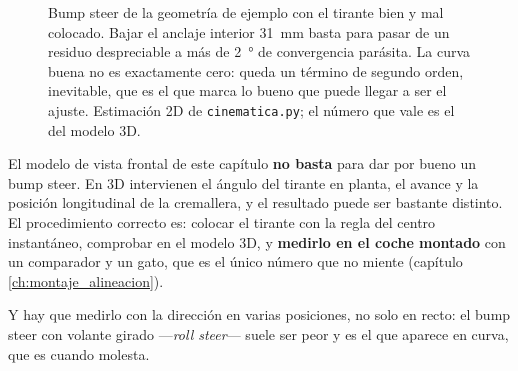 \begin{figure}[htbp]
\centering
{}
\caption[Efecto de la posición del tirante sobre el bump steer]{Bump steer de
la geometría de ejemplo con el tirante bien y mal colocado. Bajar el anclaje
interior \SI{31}{\milli\meter} basta para pasar de un residuo despreciable a
más de \SI{2}{\degree} de convergencia parásita. La curva buena no es
exactamente cero: queda un término de segundo orden, inevitable, que es el que
marca lo bueno que puede llegar a ser el ajuste. Estimación 2D de
\texttt{cinematica.py}; el número que vale es el del modelo 3D.}
\label{fig:cinematica:bumpsteer}
\end{figure}

\begin{ojo}
El modelo de vista frontal de este capítulo \textbf{no basta} para dar por bueno
un bump steer. En 3D intervienen el ángulo del tirante en planta, el avance y
la posición longitudinal de la cremallera, y el resultado puede ser bastante
distinto. El procedimiento correcto es: colocar el tirante con la regla del
centro instantáneo, comprobar en el modelo 3D, y \textbf{medirlo en el coche
montado} con un comparador y un gato, que es el único número que no miente
(capítulo \ref{ch:montaje_alineacion}).

Y hay que medirlo con la dirección en varias posiciones, no solo en recto: el
bump steer con volante girado ---\emph{roll steer}--- suele ser peor y es el
que aparece en curva, que es cuando molesta.
\end{ojo}

